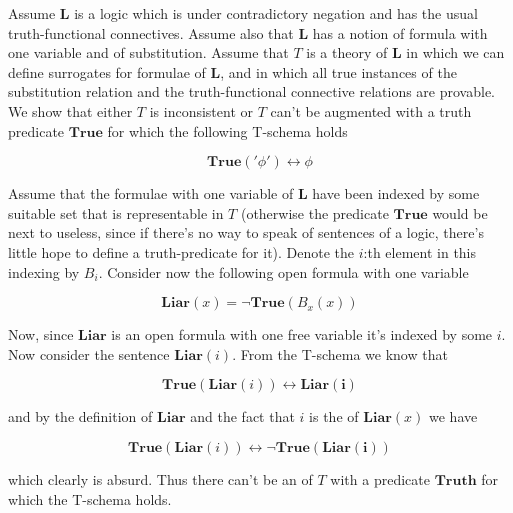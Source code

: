 \documentclass[12pt]{article}
\begin{document}
Assume $\mathbf{L}$ is a logic which is  under contradictory negation and has the usual truth-functional connectives. Assume also that $\mathbf{L}$ has a notion of  formula with one variable and of substitution. Assume that $T$ is a theory of $\mathbf{L}$ in which we can define surrogates for formulae of $\mathbf{L}$, and in which all true instances of the substitution relation and the truth-functional connective relations are provable. We show that either $T$ is inconsistent or $T$ can't be augmented with a truth predicate $\mathbf{True}$ for which the following T-schema holds

\begin{displaymath}
\mathbf{True}('\phi') \leftrightarrow \phi
\end{displaymath}

Assume that the  formulae with one variable of $\mathbf{L}$ have been indexed by some suitable set that is representable in $T$ (otherwise the predicate $\mathbf{True}$ would be next to useless, since if there's no way to speak of sentences of a logic, there's little hope to define a truth-predicate for it). Denote the $i$:th element in this indexing by $B_i$. Consider now the following open formula with one variable

\begin{displaymath}
 \mathbf{Liar}(x) = \neg \mathbf{True}(B_x(x))
\end{displaymath}

Now, since $\mathbf{Liar}$ is an open formula with one free variable it's indexed by some $i$. Now consider the sentence $\mathbf{Liar}(i)$. From the T-schema we know that

\begin{displaymath}
 \mathbf{True}(\mathbf{Liar}(i)) \leftrightarrow \mathbf{Liar(i)}
\end{displaymath}

and by the definition of $\mathbf{Liar}$ and the fact that $i$ is the  of $\mathbf{Liar}(x)$ we have 

\begin{displaymath}
 \mathbf{True}(\mathbf{Liar}(i)) \leftrightarrow \neg \mathbf{True}(\mathbf{Liar(i)})
\end{displaymath}

which clearly is absurd. Thus there can't be an  of $T$ with a predicate $\mathbf{Truth}$ for which the T-schema holds.
\end{document}
